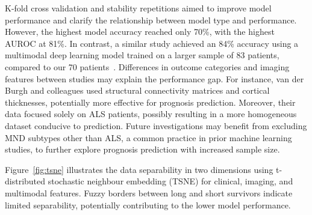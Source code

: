 K-fold cross validation and stability repetitions aimed to improve model performance and clarify the relationship between model type and performance.
However, the highest model accuracy reached only 70\%, with the highest AUROC at 81\%.
In contrast, a similar study achieved an 84\% accuracy using a multimodal deep learning model trained on a larger sample of 83 patients, compared to our 70 patients~\cite{vanderburghDeepLearningPredictions2017}.
Differences in outcome categories and imaging features between studies may explain the performance gap.
For instance, van der Burgh and colleagues used structural connectivity matrices and cortical thicknesses, potentially more effective for prognosis prediction.
Moreover, their data focused solely on ALS patients, possibly resulting in a more homogeneous dataset conducive to prediction.
Future investigations may benefit from excluding MND subtypes other than ALS, a common practice in prior machine learning studies, to further explore prognosis prediction with increased sample size.



Figure~\ref{fig:tsne} illustrates the data separability in two dimensions using t-distributed stochastic neighbour embedding (TSNE) for clinical, imaging, and multimodal features.
Fuzzy borders between long and short survivors indicate limited separability, potentially contributing to the lower model performance.

